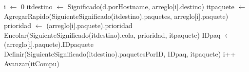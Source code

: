 \begin{Algoritmos}
\begin{algorithm}
\begin{algorithmic}[0]
	
\end{algorithmic}
\end{algorithm}

\begin{algorithm}
\begin{algorithmic}[0]

	
	\State {}
	\State i $\gets$ 0
	 	
			\State itdestino $\gets$ Significado(d.porHostname, arreglo[i].destino) 
			\State itpaquete $\gets$ AgregarRapido(SiguienteSignificado(itdestino).paquetes, arreglo[i].paquete) 
			\State {}
			\State prioridad $\gets$ (arreglo[i].paquete).prioridad
			\State Encolar(SiguienteSignificado(itdestino).cola, prioridad, itpaquete) 
			\State IDpaq $\gets$ (arreglo[i].paquete).IDpaquete 		
			\State Definir(SiguienteSignificado(itdestino).paquetesPorID, IDpaq, itpaquete) 
		\EndIf
	\State i++
	\State Avanzar(itCompu)
	\EndWhile
	
\EndFunction
\end{algorithmic}
\end{algorithm}


\end{Algoritmos}
